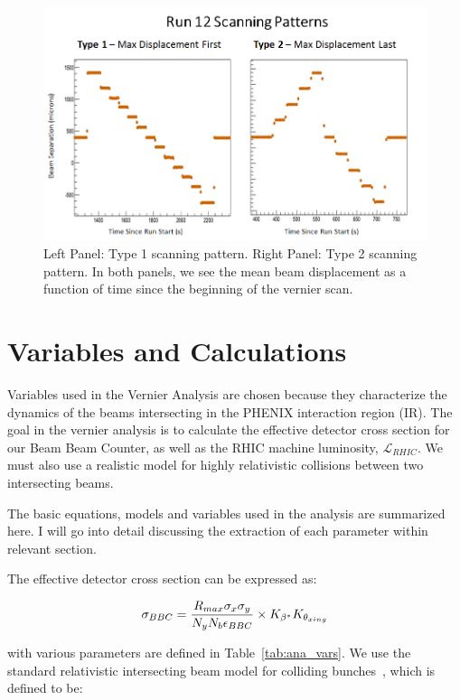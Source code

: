 \begin{figure}[ht] 
  \centering
  \includegraphics[width=0.75\linewidth]{./figures/scan_patterns} 
  \caption{ 
    Left Panel: Type 1 scanning pattern. Right Panel: Type 2 scanning pattern.
    In both panels, we see the mean beam displacement as a function of time
    since the beginning of the vernier scan.
  }
  \label{fig:scan_patterns}
\end{figure}

\section{Variables and Calculations}
\label{sec:VariablesAndCalculations}

Variables used in the Vernier Analysis are chosen because they characterize the
dynamics of the beams intersecting in the PHENIX interaction region (IR). The
goal in the vernier analysis is to calculate the effective detector cross
section for our Beam Beam Counter, as well as the RHIC machine luminosity,
$\mathcal{L}_{RHIC}$. We must also use a realistic model for highly relativistic
collisions between two intersecting beams.

The basic equations, models and variables used in the analysis are summarized
here. I will go into detail discussing the extraction of each parameter within
relevant section.

The effective detector cross section can be expressed as:

\begin{equation}
  \sigma_{BBC} = {{R_{max}\sigma_x\sigma_y}\over{N_y N_b
\epsilon_{BBC}}}\times{K_{\beta^*}K_{\theta_{xing}}}
\end{equation}

{\noindent}with various parameters are defined in Table~\ref{tab:ana_vars}.
\clearpage
We use the standard relativistic intersecting beam model for
colliding bunches~\cite{AN888Datta2010}, which is defined to be:


